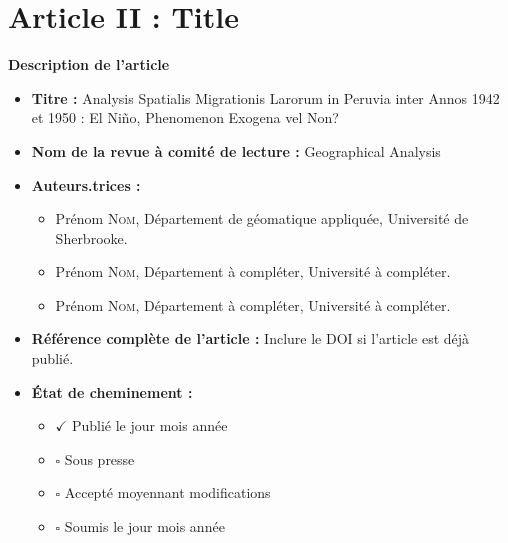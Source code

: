 \chapter{Article II : Title} \label{chap:article2}

{\large \textbf{Description de l’article}}

\begin{itemize}
  \item \textbf{Titre :} Analysis Spatialis Migrationis Larorum in Peruvia inter Annos 1942 et 1950 : El Niño, Phenomenon Exogena vel Non?
  
  \item \textbf{Nom de la revue à comité de lecture :} Geographical Analysis
  
  \item \textbf{Auteurs.trices :}
    \begin{itemize}
    \item Prénom \textsc{Nom}, Département de géomatique appliquée, Université de Sherbrooke.
    \item Prénom \textsc{Nom}, Département à compléter, Université à compléter.
    \item Prénom \textsc{Nom}, Département à compléter, Université à compléter.
  \end{itemize}
  \item \textbf{Référence complète de l'article :} Inclure le DOI si l'article est déjà publié.

  \item \textbf{État de cheminement :}
        \begin{itemize}
            \item $\checkmark$ Publié le jour mois année
            \item $\square$ Sous presse
            \item $\square$ Accepté moyennant modifications
            \item $\square$ Soumis le jour mois année
   \end{itemize}



\end{itemize}
